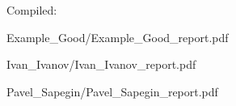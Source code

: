 \documentclass[a4paper]{article}
\begin{document}
Compiled: \DTMnow
\clearpage

{Example_Good/Example_Good_report.pdf}

{Ivan_Ivanov/Ivan_Ivanov_report.pdf}

{Pavel_Sapegin/Pavel_Sapegin_report.pdf}
\end{document}
